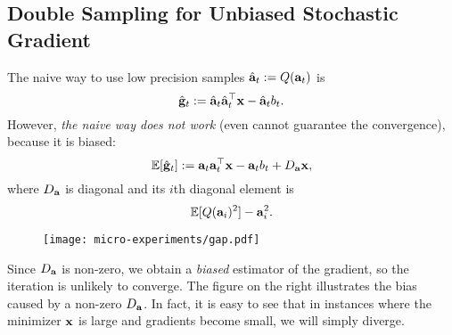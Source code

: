 \vspace{-0.5em}
\subsection{Double Sampling for Unbiased Stochastic Gradient}
\vspace{-0.5em}
The naive way to use low precision samples $\hat{{\bf a}}_t := Q({\bf a}_t)$ is 
\[
\hat{{\bf g}}_t := \hat{{\bf a}}_t \hat{{\bf a}}_t^\top {\bf x} - \hat{{\bf a}}_t b_t.
\]
However, \emph{the naive way does not work} (even cannot guarantee the convergence), because it is biased: 
\[
\mathbb{E}[\hat{{\bf g}}_t] := {\bf a}_t {\bf a}_t^\top {\bf x} - {\bf a}_t b_t + D_{{\bf a}} {\bf x}, 
\]
where $D_{{\bf a}}$ is diagonal and its $i$th diagonal element is 
\[
\mathbb{E}[ Q({\bf a}_i)^2 ] - {\bf a}_i^2.
\]
%

\begin{wrapfigure}{r}{0.23\textwidth}
  \begin{center}
    \texttt{[image: micro-experiments/gap.pdf]}
  \end{center}
  \label{fig:gap}
\end{wrapfigure}

\vspace{-0.5em}
Since $D_{{\bf a}}$ is non-zero, we obtain a \emph{biased} estimator of the gradient, so the iteration is unlikely to converge. 
The figure on the right illustrates the bias caused by a non-zero $D_{{\bf a}}$. In fact, it is easy to see that in instances where the minimizer ${\bf x}$ is large and gradients become small, we will simply diverge. 

